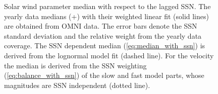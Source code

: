 \begin{figure}
	\caption{Solar wind parameter median with respect to the lagged SSN. The yearly data medians (+) with their weighted linear fit (solid lines) are obtained from OMNI data. The error bars denote the SSN standard deviation and the relative weight from the yearly data coverage. The SSN dependent median (\ref{eq:median_with_ssn}) is derived from the lognormal model fit (dashed line). For the velocity the median is derived from the SSN weighting (\ref{eq:balance_with_ssn}) of the slow and fast model parts, whose magnitudes are SSN independent (dotted line).}
	\label{fig:OMNI_yearly_BVNTvsSSN_a}
\end{figure}

